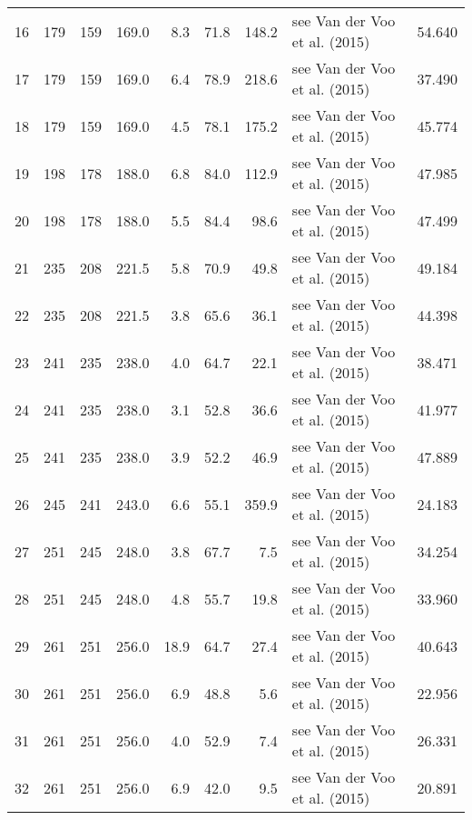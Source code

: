 \documentclass[11pt]{article}
\begin{document}
{\begin{tabular}{lrrrrrrlr}
16 &       179 &      159 &       169.0 &   8.3 &  71.8 &  148.2 &     see Van der Voo et al. (2015) &    54.640 \\
17 &       179 &      159 &       169.0 &   6.4 &  78.9 &  218.6 &     see Van der Voo et al. (2015) &    37.490 \\
18 &       179 &      159 &       169.0 &   4.5 &  78.1 &  175.2 &     see Van der Voo et al. (2015) &    45.774 \\
19 &       198 &      178 &       188.0 &   6.8 &  84.0 &  112.9 &     see Van der Voo et al. (2015) &    47.985 \\
20 &       198 &      178 &       188.0 &   5.5 &  84.4 &   98.6 &     see Van der Voo et al. (2015) &    47.499 \\
21 &       235 &      208 &       221.5 &   5.8 &  70.9 &   49.8 &     see Van der Voo et al. (2015) &    49.184 \\
22 &       235 &      208 &       221.5 &   3.8 &  65.6 &   36.1 &     see Van der Voo et al. (2015) &    44.398 \\
23 &       241 &      235 &       238.0 &   4.0 &  64.7 &   22.1 &     see Van der Voo et al. (2015) &    38.471 \\
24 &       241 &      235 &       238.0 &   3.1 &  52.8 &   36.6 &     see Van der Voo et al. (2015) &    41.977 \\
25 &       241 &      235 &       238.0 &   3.9 &  52.2 &   46.9 &     see Van der Voo et al. (2015) &    47.889 \\
26 &       245 &      241 &       243.0 &   6.6 &  55.1 &  359.9 &     see Van der Voo et al. (2015) &    24.183 \\
27 &       251 &      245 &       248.0 &   3.8 &  67.7 &    7.5 &     see Van der Voo et al. (2015) &    34.254 \\
28 &       251 &      245 &       248.0 &   4.8 &  55.7 &   19.8 &     see Van der Voo et al. (2015) &    33.960 \\
29 &       261 &      251 &       256.0 &  18.9 &  64.7 &   27.4 &     see Van der Voo et al. (2015) &    40.643 \\
30 &       261 &      251 &       256.0 &   6.9 &  48.8 &    5.6 &     see Van der Voo et al. (2015) &    22.956 \\
31 &       261 &      251 &       256.0 &   4.0 &  52.9 &    7.4 &     see Van der Voo et al. (2015) &    26.331 \\
32 &       261 &      251 &       256.0 &   6.9 &  42.0 &    9.5 &     see Van der Voo et al. (2015) &    20.891 \\

\end{tabular}}
\end{document}
